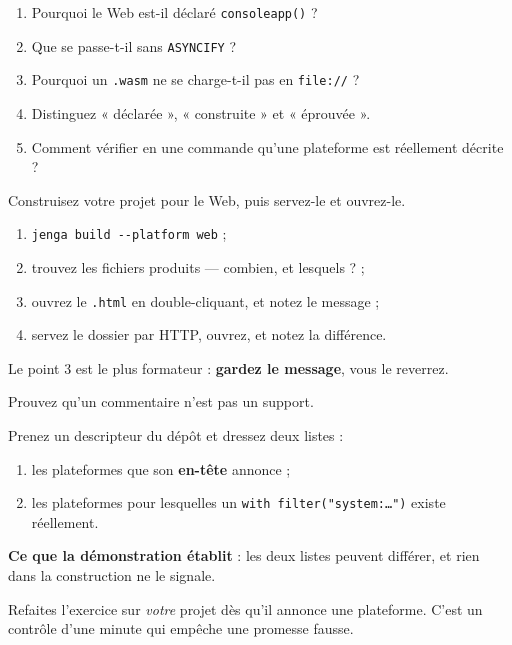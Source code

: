 \begin{nkquestions}
\begin{enumerate}
\item Pourquoi le Web est-il déclaré \texttt{consoleapp()} ?
\item Que se passe-t-il sans \texttt{ASYNCIFY} ?
\item Pourquoi un \texttt{.wasm} ne se charge-t-il pas en \texttt{file://} ?
\item Distinguez « déclarée », « construite » et « éprouvée ».
\item Comment vérifier en une commande qu'une plateforme est réellement décrite ?
\end{enumerate}
\end{nkquestions}

\begin{nkpratique}
Construisez votre projet pour le Web, puis servez-le et ouvrez-le.

\begin{enumerate}
\item \texttt{jenga build -{}-platform web} ;
\item trouvez les fichiers produits --- combien, et lesquels ? ;
\item ouvrez le \texttt{.html} en double-cliquant, et notez le message ;
\item servez le dossier par HTTP, ouvrez, et notez la différence.
\end{enumerate}

Le point 3 est le plus formateur : \textbf{gardez le message}, vous le
reverrez.
\end{nkpratique}

\begin{nkdemo}
Prouvez qu'un commentaire n'est pas un support.

Prenez un descripteur du dépôt et dressez deux listes :
\begin{enumerate}
\item les plateformes que son \textbf{en-tête} annonce ;
\item les plateformes pour lesquelles un \texttt{with filter("system:\dots")}
      existe réellement.
\end{enumerate}

\textbf{Ce que la démonstration établit} : les deux listes peuvent différer, et
rien dans la construction ne le signale.

Refaites l'exercice sur \emph{votre} projet dès qu'il annonce une plateforme.
C'est un contrôle d'une minute qui empêche une promesse fausse.
\end{nkdemo}

